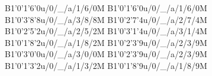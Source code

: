 B1'0'1'6'0u/0/_/a/1/6/0M
B1'0'1'6'0u/0/_/a/1/6/0M
B1'0'3'8'8u/0/_/a/3/8/8M
B1'0'2'7'4u/0/_/a/2/7/4M
B1'0'2'5'2u/0/_/a/2/5/2M
B1'0'3'1'4u/0/_/a/3/1/4M
B1'0'1'8'2u/0/_/a/1/8/2M
B1'0'2'3'9u/0/_/a/2/3/9M
B1'0'3'0'0u/0/_/a/3/0/0M
B1'0'2'3'9u/0/_/a/2/3/9M
B1'0'1'3'2u/0/_/a/1/3/2M
B1'0'1'8'9u/0/_/a/1/8/9M
